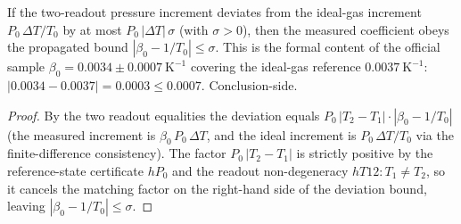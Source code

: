 \begin{theorem}
\label{thm:IPhO2026Problems_problem_IPhO_2026_4_A_5:beta0_uncertainty_bound}
If the two-readout pressure increment deviates from the ideal-gas
increment $P_0\,\Delta T/T_0$ by at most $P_0\,|\Delta T|\,\sigma$
(with $\sigma > 0$), then the measured coefficient obeys the propagated
bound $|\beta_0 - 1/T_0| \le \sigma$.  This is the formal content of the
official sample $\beta_0 = 0.0034 \pm 0.0007\ \mathrm{K^{-1}}$ covering
the ideal-gas reference $0.0037\ \mathrm{K^{-1}}$:
$|0.0034 - 0.0037| = 0.0003 \le 0.0007$.  Conclusion-side.
\end{theorem}
\begin{proof}
By the two readout equalities the deviation equals
$P_0\,|T_2 - T_1|\cdot|\beta_0 - 1/T_0|$ (the measured increment is
$\beta_0\,P_0\,\Delta T$, and the ideal increment is $P_0\,\Delta T/T_0$
via the finite-difference consistency).  The factor
$P_0\,|T_2 - T_1|$ is strictly positive by the reference-state
certificate $hP_0$ and the readout non-degeneracy $hT12 : T_1 \ne T_2$,
so it cancels the matching factor on the right-hand side of the deviation
bound, leaving $|\beta_0 - 1/T_0| \le \sigma$.
\end{proof}

